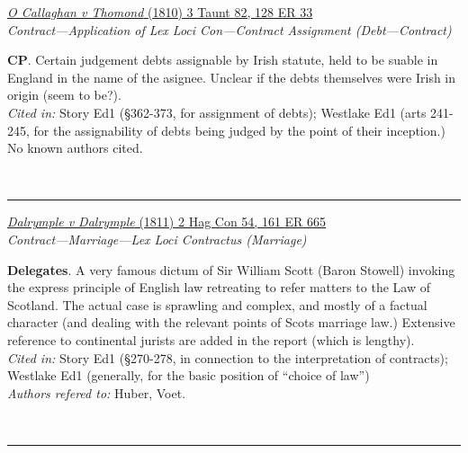 \documentclass[twoside]{article}
\begin{document}
        \begin{small}
        \begin{center}
        \href{https://heinonline.org/HOL/P?h=hein.engrep/engrg0128&i=37}{\textit{O Callaghan v Thomond} (1810) 3 Taunt 82, 128 ER 33} \label{44} \\ 
\textit{Contract---Application of Lex Loci Con---Contract Assignment (Debt---Contract)}\\
        \end{center}
        \textbf{CP}. Certain judgement debts assignable by Irish statute, held to be suable in England in the name of the asignee. Unclear if the debts themselves were Irish in origin (seem to be?).\\\textit{Cited in: }Story Ed1 (§362-373, for assignment of debts); Westlake Ed1 (arts 241-245, for the assignability of debts being judged by the point of their inception.)\\No known authors cited.
        \end{small}\\
        \rule{\textwidth}{0.5pt}
        

        \begin{small}
        \begin{center}
        \href{https://heinonline.org/HOL/P?h=hein.engrep/engri0161&i=671}{\textit{Dalrymple v Dalrymple} (1811) 2 Hag Con 54, 161 ER 665} \label{52} \\ 
\textit{Contract---Marriage---Lex Loci Contractus (Marriage)}\\
        \end{center}
        \textbf{Delegates}. A very famous dictum of Sir William Scott (Baron Stowell) invoking the express principle of English law retreating to refer matters to the Law of Scotland. The actual case is sprawling and complex, and mostly of a factual character (and dealing with the relevant points of Scots marriage law.) Extensive reference to continental jurists are added in the report (which is lengthy).\\\textit{Cited in: }Story Ed1 (§270-278, in connection to the interpretation of contracts); Westlake Ed1 (generally, for the basic position of “choice of law”)\\\textit{Authors refered to: }Huber, Voet.
        \end{small}\\
        \rule{\textwidth}{0.5pt}
        
\end{document}
